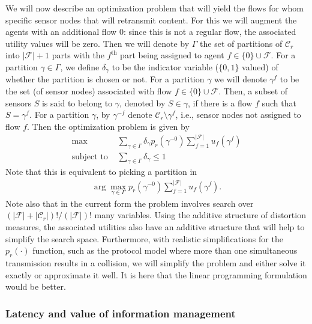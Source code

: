 \documentclass[12pt,letterpaper]{article}
\begin{document}
We will now describe an optimization problem that will yield the flows for whom specific sensor nodes that will retransmit content. For this we will augment the agents with an additional flow $0$: since this is not a regular flow, the associated utility values will be zero. Then we will denote by $\Gamma$ the set of partitions of $\mathcal{C}_r$ into $|\mathcal{F}|+1$ parts with the $f^{\mathrm{th}}$ part being assigned to agent $f\in \{0\} \cup \mathcal{F}$. For a partition $\gamma \in \Gamma$, we define $\delta_\gamma$ to be the indicator variable ($\{0,1\}$ valued) of whether the partition is chosen or not. For a partition $\gamma$ we will denote $\gamma^f$ to be the set (of sensor nodes) associated with flow $f\in \{0\} \cup \mathcal{F}$. Then, a subset of sensors $S$ is said to belong to $\gamma$, denoted by $S\in \gamma$, if there is a flow $f$ such that $S=\gamma^f$. For a partition $\gamma$, by $\gamma^{-f}$ denote $\mathcal{C}_r\setminus \gamma^f$, i.e., sensor nodes not assigned to flow $f$. Then the optimization problem is given by
\begin{align*}
\max & \sum_{\gamma \in \Gamma}\delta_\gamma p_r(\gamma^{-0}) \sum_{f=1}^{|\mathcal{F}|} u_f(\gamma^f)\\
\text{subject to } & \sum_{\gamma \in \Gamma} \delta_\gamma \leq 1
\end{align*}
Note that this is equivalent to picking a partition in 
\begin{align*}
\arg\max_{\gamma \in \Gamma} p_r(\gamma^{-0}) \sum_{f=1}^{|\mathcal{F}|} u_f(\gamma^f).
\end{align*}
Note also that in the current form the problem involves search over $(|\mathcal{F}|+|\mathcal{C}_r|)!/(|\mathcal{F}|)!$ many variables. Using the additive structure of distortion measures, the associated utilities also have an additive structure that will help to simplify the search space. Furthermore, with realistic simplifications for the $p_r(\cdot)$ function, such as the protocol model where more than one simultaneous transmission results in a collision, we will simplify the problem and either solve it exactly or approximate it well. It is here that the linear programming formulation would be better.

\subsubsection{Latency and value of information management}\label{subsec:latency}
\end{document}
